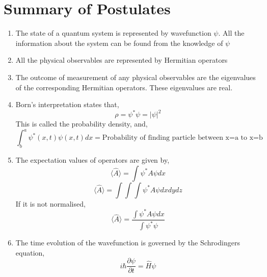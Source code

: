 \section{Summary of Postulates}
\begin{enumerate}
    \item The state of a quantum system is represented by wavefunction $\psi$. All the information about the system can be found from the knowledge of $\psi$
    \item All the physical observables are represented by Hermitian operators
    \item The outcome of measurement of any physical observables are the eigenvalues of the corresponding Hermitian operators. These eigenvalues are real.
    \item Born's interpretation states that,
    \begin{equation*}
        \rho = \psi^*\psi=|\psi|^2
    \end{equation*}
    This is called the probability density, and,
    \begin{equation*}
        \int_{b}^{a}\psi^*(x,t)\psi(x,t)dx=\text{Probability of finding particle between x=a to x=b}
    \end{equation*}
    \item The expectation values of operators are given by,
    \begin{equation*}
        \langle\hat{A}\rangle=\int\psi^*A\psi dx
    \end{equation*}
    \begin{equation*}
        \langle\hat{A}\rangle=\int\int\int \psi^*A\psi dx dy dz
    \end{equation*}
    If it is not normalised,
    \begin{equation*}
        \langle \hat{A}\rangle=\frac{\int\psi^*A\psi dx}{\int\psi^*\psi}
    \end{equation*}
    \item The time evolution of the wavefunction is governed by the Schrodingers equation,
    \begin{equation*}
        i\hbar\frac{\partial \psi}{\partial t}=\hat{H}\psi
    \end{equation*}
\end{enumerate}
